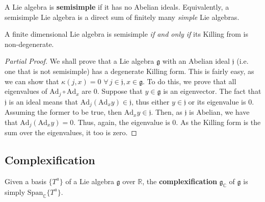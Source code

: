 \documentclass[11pt,fleqn]{article}
\begin{document}
\begin{definition}[Semisimple]
	A Lie algebra is \textbf{semisimple} if it has no Abelian ideals. Equivalently, a semisimple Lie algebra is a direct sum of finitely many \textit{simple} Lie algebras.
\end{definition}

\begin{theorem}
	A finite dimensional Lie algebra is semisimple \textit{if and only if} its Killing from is non-degenerate.
\end{theorem}
\begin{proof}[Partial Proof]
	We shall prove that a Lie algebra $\mathfrak{g}$ with an Abelian ideal $\mathfrak{j}$ (i.e. one that is not semisimple) has a degenerate Killing form. This is fairly easy, as we can show that $\kappa(j,x) = 0$ $\forall \, j \in \mathfrak{j}, x \in \mathfrak{g}$. To do this, we prove that all eigenvalues of $\text{Ad}_j \circ \text{Ad}_x$ are $0$. Suppose that $y \in \mathfrak{g}$ is an eigenvector. The fact that $\mathfrak{j}$ is an ideal means that $\text{Ad}_j \left( \text{Ad}_x y \right) \in \mathfrak{j}$, thus either $y \in \mathfrak{j}$ or its eigenvalue is $0$. Assuming the former to be true, then $\text{Ad}_x y \in \mathfrak{j}$. Then, as $\mathfrak{j}$ is Abelian, we have that $\text{Ad}_j \left( \text{Ad}_x y \right) = 0$. Thus, again, the eigenvalue is $0$. As the Killing form is the sum over the eigenvalues, it too is zero.
\end{proof}

\subsection{Complexification}

\begin{definition}[Complexification]
	Given a basis $\{ T^a \}$ of a Lie algebra $\mathfrak{g}$ over $\mathbb{R}$, the \textbf{complexification} $\mathfrak{g}_\mathbb{C}$ of $\mathfrak{g}$ is simply $\text{Span}_\mathbb{C} \{ T^a \}$.
\end{definition}
\end{document}
